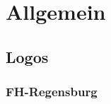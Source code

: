 \documentclass{scrreprt}
\begin{document}
\tableofcontents
%
%

\part{Allgemein}
\chapter{Logos}
\section{FH-Regensburg}

\end{document}
